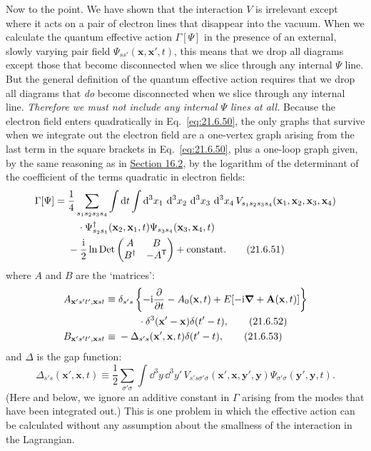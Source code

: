 Now to the point. We have shown that the interaction $V$ is irrelevant except where it acts on a pair of electron lines that disappear into the vacuum. When we calculate the quantum effective action $\Gamma[\Psi]$ in the presence of an external, slowly varying pair field $\Psi_{ss'}(\mathbf x,\mathbf x',t)$, this means that we drop all diagrams except those that become disconnected when we slice through any internal $\Psi$ line. But the general definition of the quantum effective action requires that we drop all diagrams that \emph{do} become disconnected when we slice through any internal line. \emph{Therefore we must not include any internal $\Psi$ lines at all.} Because the electron field enters quadratically in Eq.~\eqref{eq:21.6.50}, the only graphs that survive when we integrate out the electron field are a one-vertex graph arising from the last term in the square brackets in Eq.~\eqref{eq:21.6.50}, plus a one-loop graph given, by the same reasoning as in \hyperref[sec:16.2]{Section 16.2}, by the logarithm of the determinant of the coefficient of the terms quadratic in electron fields:
\begin{align}
\Gamma[\Psi]
={}&\frac14\sum_{s_1s_2s_3s_4}
\int \mathop{}\!\mathrm{d} t\int \mathop{}\!\mathrm{d}^3x_1\,\mathop{}\!\mathrm{d}^3x_2\,\mathop{}\!\mathrm{d}^3x_3\,\mathop{}\!\mathrm{d}^3x_4\,
V_{s_1s_2s_3s_4}(\mathbf x_1,\mathbf x_2,\mathbf x_3,\mathbf x_4)
\notag\\
&\quad\cdot
\Psi^\dagger_{s_2s_1}(\mathbf x_2,\mathbf x_1,t)
\Psi_{s_3s_4}(\mathbf x_3,\mathbf x_4,t)
\notag\\
&-\frac{\mathrm{i}}{2}\ln\operatorname{Det}
\begin{pmatrix}
A&B\\
B^\dagger&-A^{\mathsf T}
\end{pmatrix}
+\text{constant}.
\tag{21.6.51}\label{eq:21.6.51}
\end{align}
where $A$ and $B$ are the `matrices':
\begin{align}
A_{\mathbf x's't',\mathbf xst}
\equiv{}&\delta_{s's}
\left\{
-\mathrm{i}\frac{\partial}{\partial t}-A_0(\mathbf x,t)
+E[-\mathrm{i}\boldsymbol\nabla+\mathbf A(\mathbf x,t)]
\right\}
\notag\\
&\qquad\cdot\delta^3(\mathbf x'-\mathbf x)\delta(t'-t),
\tag{21.6.52}\label{eq:21.6.52}\\
B_{\mathbf x's't',\mathbf xst}
\equiv{}&-\Delta_{s's}(\mathbf x',\mathbf x,t)\delta(t'-t),
\tag{21.6.53}\label{eq:21.6.53}
\end{align}
and $\Delta$ is the gap function:
\begin{equation}
\Delta_{s's}(\mathbf x',\mathbf x,t)
\equiv\frac12\sum_{\sigma'\sigma}
\int \dd^3y\,\dd^3y'\,
V_{s's\sigma'\sigma}(\mathbf x',\mathbf x,\mathbf y',\mathbf y)
\Psi_{\sigma'\sigma}(\mathbf y',\mathbf y,t).
\tag{21.6.54}\label{eq:21.6.54}
\end{equation}
(Here and below, we ignore an additive constant in $\Gamma$ arising from the modes that have been integrated out.) This is one problem in which the effective action can be calculated without any assumption about the smallness of the interaction in the Lagrangian.

